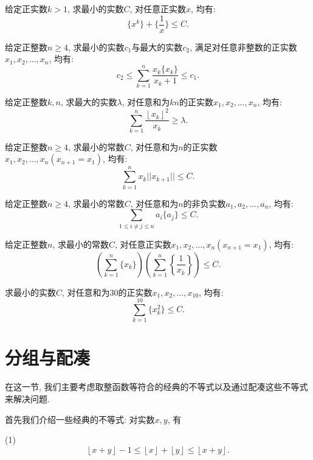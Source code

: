 \documentclass[lang=cn,12pt,thmcnt=section]{elegantbook}
\newcommand{\fl}[1]{\left\lfloor #1\right\rfloor}
\begin{document}
\begin{exercise}
给定正实数$k>1$, 求最小的实数$C$, 对任意正实数$x$, 均有: 
\[
\{x^k\}+\{\frac{1}{x}\}\le C.
\]
\end{exercise}

\begin{exercise}
给定正整数$n\ge 4$, 求最小的实数$c_1$与最大的实数$c_2$, 满足对任意非整数的正实数$x_1,x_2,\dots{},x_n$, 均有: 
\[
c_2\le \sum_{k=1}^n \frac{x_k\{x_k\}}{x_k+1}\le c_1.
\]
\end{exercise}

\begin{exercise}
给定正整数$k,n$, 求最大的实数$\lambda$, 对任意和为$kn$的正实数$x_1,x_2,\dots{},x_n$, 均有: 
\[
\sum_{k=1}^n \frac{\fl{x_k}^2}{x_k}\ge \lambda.
\]
\end{exercise}

\begin{exercise}
给定正整数$n\ge 4$, 求最小的常数$C$, 对任意和为$n$的正实数$x_1,x_2,\dots{},x_n(x_{n+1}=x_1)$, 均有:
\[
\sum_{k=1}^n x_k||x_{k+1}||\le C.
\]
\end{exercise}

\begin{exercise}
给定正整数$n\ge 4$, 求最小的常数$C$, 对任意和为$n$的非负实数$a_1,a_2,\dots{},a_n$, 均有: 
\[
\sum_{1\le i\ne j\le n}a_i\{a_j\}\le C.
\]

\end{exercise}

\begin{exercise}
给定正整数$n$, 求最小的常数$C$, 对任意正实数$x_1,x_2,\dots{},x_n(x_{n+1}=x_1)$, 均有:
\[
\left(\sum_{k=1}^n \{x_k\}\right)\left(\sum_{k=1}^n\left\{\frac{1}{x_k}\right\}\right)\le C.
\]
\end{exercise}

\begin{exercise}
求最小的实数$C$, 对任意和为$30$的正实数$x_1,x_2,\dots{},x_{10}$, 均有: 
\[
\sum_{k=1}^{10}\{x_k^2\}\le C.
\]
\end{exercise}

\section{分组与配凑}

在这一节, 我们主要考虑取整函数等符合的经典的不等式以及通过配凑这些不等式来解决问题.

首先我们介绍一些经典的不等式: 对实数$x,y$, 有

(1)
\[\fl{x+y}-1\le \fl{x}+\fl{y}\le \fl{x+y}.\]
\end{document}
